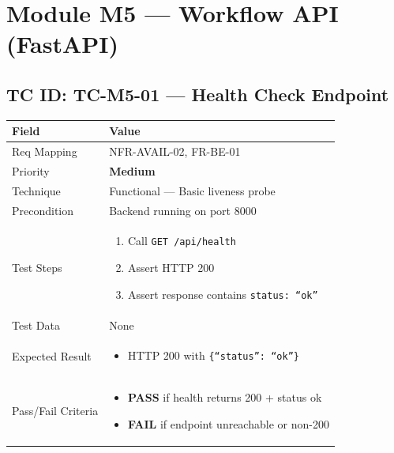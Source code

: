 \documentclass[12pt,a4paper]{article}
\newcommand{\sevmed}{\textcolor{severitymed}{\textbf{Medium}}}
\newcommand{\passresult}{\textcolor{passgreen}{\textbf{PASS}}}
\newcommand{\failresult}{\textcolor{failred}{\textbf{FAIL}}}
\begin{document}
\newpage

\section{Module M5 --- Workflow API (FastAPI)}

\subsection{TC ID: TC-M5-01 --- Health Check Endpoint}

\begin{tabular}{|p{}|p{}|}
\hline
\rowcolor{lightblue} \textbf{Field} & \textbf{Value} \\
\hline
Req Mapping & NFR-AVAIL-02, FR-BE-01 \\
\hline
Priority & \sevmed \\
\hline
Technique & Functional --- Basic liveness probe \\
\hline
Precondition & Backend running on port 8000 \\
\hline
Test Steps &
\begin{enumerate}[nosep, leftmargin=*]
  \item Call \texttt{GET /api/health}
  \item Assert HTTP 200
  \item Assert response contains \texttt{status: ``ok''}
\end{enumerate} \\
\hline
Test Data & None \\
\hline
Expected Result &
\begin{itemize}[nosep, leftmargin=*]
  \item HTTP 200 with \texttt{\{``status'': ``ok''\}}
\end{itemize} \\
\hline
Pass/Fail Criteria &
\begin{itemize}[nosep, leftmargin=*]
  \item \passresult{} if health returns 200 + status ok
  \item \failresult{} if endpoint unreachable or non-200
\end{itemize} \\
\hline
\end{tabular}
\end{document}
